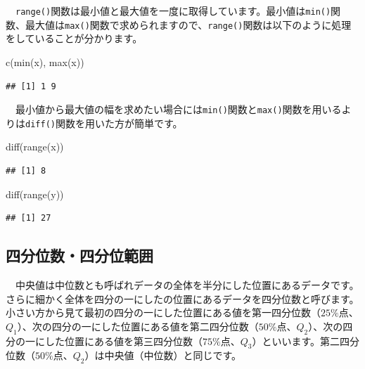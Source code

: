 \documentclass[
  12pt,
]{book}
\newenvironment{Shaded}{\begin{snugshade}}{\end{snugshade}}
\newcommand{\FunctionTok}[1]{\textcolor[rgb]{0.00,0.00,0.00}{#1}}
\newcommand{\NormalTok}[1]{#1}
\begin{document}
　\texttt{range()}関数は最小値と最大値を一度に取得しています。最小値は\texttt{min()}関数、最大値は\texttt{max()}関数で求められますので、\texttt{range()}関数は以下のように処理をしていることが分かります。

\begin{Shaded}
\begin{Highlighting}[numbers=left,,]
\FunctionTok{c}\NormalTok{(}\FunctionTok{min}\NormalTok{(x), }\FunctionTok{max}\NormalTok{(x))}
\end{Highlighting}
\end{Shaded}

\begin{verbatim}
## [1] 1 9
\end{verbatim}

　最小値から最大値の幅を求めたい場合には\texttt{min()}関数と\texttt{max()}関数を用いるよりは\texttt{diff()}関数を用いた方が簡単です。

\begin{Shaded}
\begin{Highlighting}[numbers=left,,]
\FunctionTok{diff}\NormalTok{(}\FunctionTok{range}\NormalTok{(x))}
\end{Highlighting}
\end{Shaded}

\begin{verbatim}
## [1] 8
\end{verbatim}

\begin{Shaded}
\begin{Highlighting}[numbers=left,,]
\FunctionTok{diff}\NormalTok{(}\FunctionTok{range}\NormalTok{(y))}
\end{Highlighting}
\end{Shaded}

\begin{verbatim}
## [1] 27
\end{verbatim}

\newpage

\hypertarget{ux56dbux5206ux4f4dux6570ux56dbux5206ux4f4dux7bc4ux56f2}{%
\subsection{\texorpdfstring{四分位数・四分位範囲}{四分位数・四分位範囲}}\label{ux56dbux5206ux4f4dux6570ux56dbux5206ux4f4dux7bc4ux56f2}}

　中央値は中位数とも呼ばれデータの全体を半分にした位置にあるデータです。さらに細かく全体を四分の一にしたの位置にあるデータを四分位数と呼びます。小さい方から見て最初の四分の一にした位置にある値を第一四分位数（\(25\%\)点、\(Q_1\)）、次の四分の一にした位置にある値を第二四分位数（\(50\%\)点、\(Q_2\)）、次の四分の一にした位置にある値を第三四分位数（\(75\%\)点、\(Q_3\)）といいます。第二四分位数（\(50\%\)点、\(Q_2\)）は中央値（中位数）と同じです。
\end{document}
